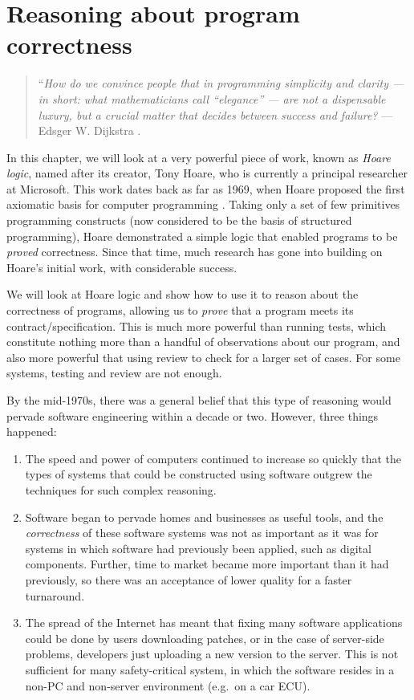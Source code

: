 \chapter{Reasoning about program correctness}

\begin{quote}
``\emph{How do we convince people that in programming simplicity and clarity --- in short: what mathematicians call ``elegance'' --- are not a dispensable luxury, but a crucial matter that decides between success and failure?} --- Edsger W. Dijkstra \cite{dijkstra82}.
\end{quote}


In this chapter, we will look at a very powerful piece of work, known as \emph{Hoare logic}, named after its creator, Tony Hoare, who is currently a principal researcher at Microsoft. This work dates back as far as 1969, when Hoare proposed the first axiomatic basis for computer programming \cite{hoare69}. Taking only a set of few primitives programming constructs (now considered to be the basis of structured programming), Hoare demonstrated a simple logic that enabled programs to be \emph{proved} correctness. Since that time, much research has gone into building on Hoare's initial work, with considerable success.

We will look at Hoare logic and show how to use it to reason about the correctness of programs, allowing us to \emph{prove} that a program meets its contract/specification. This is much more powerful than running tests, which constitute nothing more than a handful of observations about our program, and also more powerful that using review to check for a larger set of cases. For some systems, testing and review are not enough.

By the mid-1970s, there was a general belief that this type of reasoning would pervade software engineering within a decade or two. However, three things happened:

\begin{enumerate}

 \item The speed and power of computers continued to increase so quickly that the types of systems that could be constructed using software outgrew the techniques for such complex reasoning.

 \item Software began to pervade homes and businesses as useful tools, and the \emph{correctness} of these software systems was not as important as it was for systems in which software had previously been applied, such as digital components. Further, time to market became more important than it had previously, so there was an acceptance of lower quality for a faster turnaround.

 \item The spread of the Internet has meant that fixing many software applications could be done by users downloading patches, or in the case of server-side problems, developers just uploading a new version to the server. This is not sufficient for many safety-critical system, in which the software resides in a non-PC and non-server environment (e.g.\ on a car ECU).

\end{enumerate}

